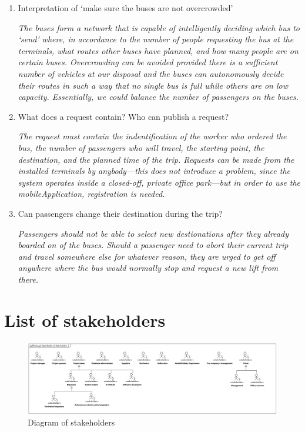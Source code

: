 \documentclass[a4paper]{article}
\begin{document}
\begin{enumerate}
	\item Interpretation of ‘make sure the buses are not overcrowded’

		\textit{The buses form a network that is capable of
			intelligently deciding which bus to ‘send’ where, in
			accordance to the number of people \gls{request}ing the
			bus at the \gls{terminal}s, what \gls{route}s other
			buses have planned, and how many people are on certain
			buses. Overcrowding can be avoided provided there is a
			sufficient number of \gls{vehicle}s at our disposal and
			the buses can \gls{autonomous}ly decide their
			\gls{route}s in such a way that no single bus is full
			while others are on low capacity. Essentially, we could
			balance the number of passengers on the buses.}

	\item What does a \gls{request} contain? Who can publish a
	      \gls{request}?

		\textit{The \gls{request} must contain the indentification of
			the worker who ordered the bus, the number of passengers
			who will travel, the starting point, the destination,
			and the planned time of the trip. Requests can be made
			from the installed terminals by anybody—this does not
			introduce a problem, since the system operates inside a
			closed-off, private office park—but in order to use
			the \gls{mobileApplication}, registration is needed.}

	\item Can passengers change their destination during the trip?

		\textit{Passengers should not be able to select new
			destionations after they already boarded on of the
			buses. Should a passenger need to abort their current
			trip and travel somewhere else for whatever reason, they
			are urged to get off anywhere where the bus would
			normally stop and \gls{request} a new lift from there.}
\end{enumerate}


\section{List of stakeholders}

\begin{figure}
	\centering
	\includegraphics[width=\textwidth]{stakeholders.jpg} %
	\caption{Diagram of stakeholders}%
	\label{fig:stakeholders}
\end{figure}
\end{document}
